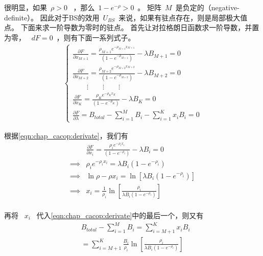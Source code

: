 很明显，如果~$\rho >0$~ ，那么~$1-e^{-\rho} >0$~。
矩阵~${M}$~是负定的（negative-definite）。
因此对于BS的效用~$U_{BS}$~来说，如果有驻点存在，则是局部极大值点。
下面来求一阶导数为零时的驻点。
首先让对拉格朗日函数求一阶导数，并置为零，
~$dF = 0$~，则有下面一系列式子。
\begin{align} 
\begin{cases}
\frac{\partial F}{\partial x_{M+1}} =
\frac{\rho_{M+1} e^{-\rho_{M+1} x_{M+1}}}{(1-e^{-\rho_{M+1}})} - \lambda B_{M+1} = 0 \\
\frac{\partial F}{\partial x_{M+2}} =
\frac{\rho_{M+2} e^{-\rho_{M+2} x_{M+2}}}{(1-e^{-\rho_{M+2}})} - \lambda B_{M+2} = 0 \\
\qquad \vdots \qquad \vdots \qquad \vdots \\
\frac{\partial F}{\partial x_K} =
\frac{\rho_K e^{-\rho_K x_K}}{(1-e^{-\rho_K})} - \lambda B_K = 0 \\
\frac{\partial F}{\partial \lambda} = B_{total} - \sum_{i=1}^M B_i -
\sum^K_{i=1}x_iB_i = 0 
\end{cases}
\label{eqn:chap_cacop:derivate}
\end{align}


根据\eqref{eqn:chap_cacop:derivate}，我们有
\begin{equation*}
\begin{split}
&\frac{\partial F}{\partial x_i} = \frac{\rho_i e^{-\rho_i
x_i}}{(1-e^{-\rho_i})} - \lambda B_i = 0\\
\implies &\rho_i e^{-\rho_i x_i} =\lambda B_i(1-e^{-\rho_i})\\
\implies &\ln\rho - \rho x_i = \ln [\lambda B_i (1-e^{-\rho_i})]\\
\implies &x_i = \frac{1}{\rho_i} \ln \left[ \frac{\rho_i}{\lambda B_i(1-e^{-\rho_i})} \right] \\
\end{split}
\end{equation*}

再将 ~$x_i$~ 代入\eqref{eqn:chap_cacop:derivate}中的最后一个，则又有
%
\begin{equation}
\begin{split}
&B_{total} -\sum_{i=1}^MB_i = \sum_{i=M+1}^K x_i B_i \\
&= \sum_{i=M+1}^K \frac{B_i}{\rho_i} \ln \left[ \frac{\rho_i}{\lambda B_i(1-e^{-\rho_i})} \right] \\
\end{split}
\label{eqn_find_mu}
\end{equation}

